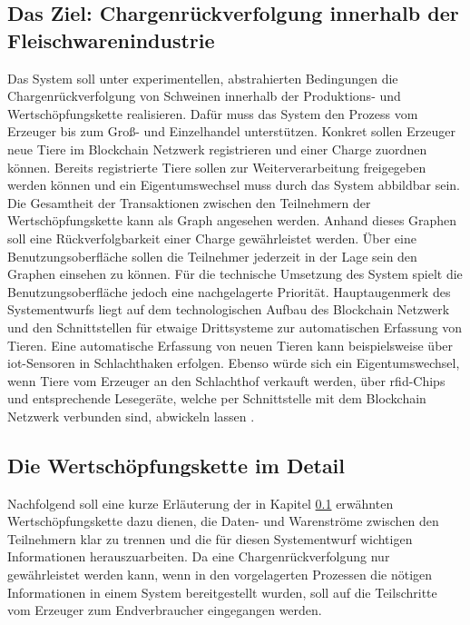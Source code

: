 \subsection{Das Ziel: Chargenrückverfolgung innerhalb der Fleischwarenindustrie} \label{goal-description}
Das System soll unter experimentellen, abstrahierten Bedingungen die Chargenrückverfolgung von Schweinen innerhalb der Produktions- und Wertschöpfungskette realisieren. Dafür muss das System den Prozess vom Erzeuger bis zum Groß- und Einzelhandel unterstützen. Konkret sollen Erzeuger neue Tiere im Blockchain Netzwerk registrieren und einer Charge zuordnen können. Bereits registrierte Tiere sollen zur Weiterverarbeitung freigegeben werden können und ein Eigentumswechsel muss durch das System abbildbar sein. Die Gesamtheit der Transaktionen zwischen den Teilnehmern der Wertschöpfungskette kann als Graph angesehen werden. Anhand dieses Graphen soll eine Rückverfolgbarkeit einer Charge gewährleistet werden. Über eine Benutzungsoberfläche sollen die Teilnehmer jederzeit in der Lage sein den Graphen einsehen zu können. Für die technische Umsetzung des System spielt die Benutzungsoberfläche jedoch eine nachgelagerte Priorität. Hauptaugenmerk des Systementwurfs liegt auf dem technologischen Aufbau des Blockchain Netzwerk und den Schnittstellen für etwaige Drittsysteme zur automatischen Erfassung von Tieren. Eine automatische Erfassung von neuen Tieren kann beispielsweise über \ac{iot}-Sensoren in Schlachthaken erfolgen. Ebenso würde sich ein Eigentumswechsel, wenn Tiere vom Erzeuger an den Schlachthof verkauft werden, über \acs{rfid}-Chips und entsprechende Lesegeräte, welche per Schnittstelle mit dem Blockchain Netzwerk verbunden sind, abwickeln lassen \citep{Dorri2017, Samaniego2016}.

\subsection{Die Wertschöpfungskette im Detail}
Nachfolgend soll eine kurze Erläuterung der in Kapitel \ref{goal-description} erwähnten Wertschöpfungskette dazu dienen, die Daten- und Warenströme zwischen den Teilnehmern klar zu trennen und die für diesen Systementwurf wichtigen Informationen herauszuarbeiten. Da eine Chargenrückverfolgung nur gewährleistet werden kann, wenn in den vorgelagerten Prozessen die nötigen Informationen in einem System bereitgestellt wurden, soll auf die Teilschritte vom Erzeuger zum Endverbraucher eingegangen werden.

